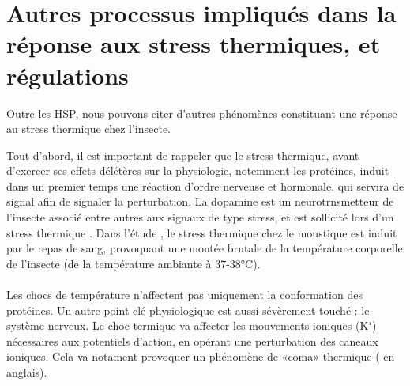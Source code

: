 	\section{Autres processus impliqués dans la réponse aux stress thermiques, et régulations} %
	\label{sec:rep_misc}
%		

Outre les HSP, nous pouvons citer d'autres phénomènes constituant une réponse au stress thermique chez l'insecte.

Tout d'abord, il est important de rappeler que le stress thermique, avant d'exercer ses effets délétères sur la physiologie, notemment les protéines, induit dans un premier temps une réaction d'ordre nerveuse et hormonale, qui servira de signal afin de signaler la perturbation.
La dopamine est un neurotrnsmetteur de l'insecte associé entre autres aux signaux de type stress, et est sollicité lors d'un stress thermique \cite{andersen2006}. Dans l'étude \cite{andersen2006}, le stress thermique chez le moustique est induit par le repas de sang, provoquant une montée brutale de la température corporelle de l'insecte (de la température ambiante à 37-38°C).


\paragraph{}

Les chocs de température n'affectent pas uniquement la conformation des protéines.
Un autre point clé physiologique est aussi sévèrement touché : le système nerveux.
Le choc termique va affecter les mouvements ioniques (K⁺) nécessaires aux potentiels d'action, en opérant une perturbation des caneaux ioniques.
Cela va notament provoquer un phénomène de «coma» thermique ( en anglais)\cite{armstrong2012}.






